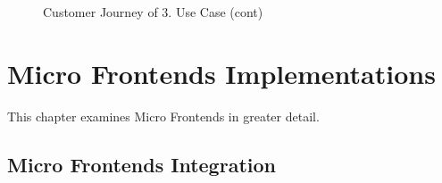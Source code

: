 \documentclass[a4paper]{book}
\begin{document}
\begin{figure}[h!]
    \centering
    \captionsetup{justification=centering}
    \caption{Customer Journey of 3. Use Case (cont)}
    \label{Customer Journey of 3. Use Case}
\end{figure}

\chapter{Micro Frontends Implementations} \label{Micro Frontends Implementations}
This chapter examines Micro Frontends in greater detail.
\section{Micro Frontends Integration} 
\end{document}

